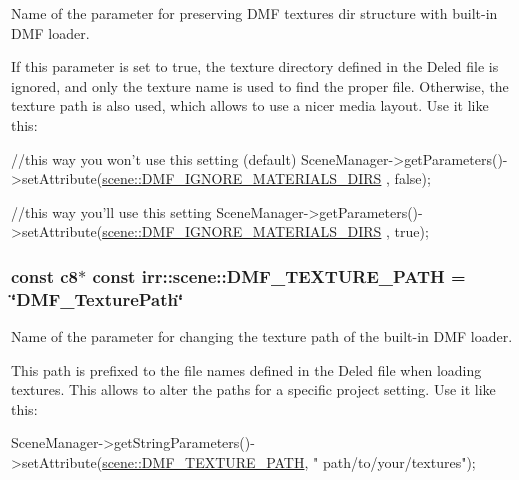 Name of the parameter for preserving D\+MF textures dir structure with built-\/in D\+MF loader. 

If this parameter is set to true, the texture directory defined in the Deled file is ignored, and only the texture name is used to find the proper file. Otherwise, the texture path is also used, which allows to use a nicer media layout. Use it like this\+: 
\begin{DoxyCode}
\textcolor{comment}{//this way you won't use this setting (default)}
SceneManager->getParameters()->setAttribute(\hyperlink{namespaceirr_1_1scene_ae996d826263cf504dd0260d0a096b0d0}{scene::DMF\_IGNORE\_MATERIALS\_DIRS}
      , \textcolor{keyword}{false});
\end{DoxyCode}
 
\begin{DoxyCode}
\textcolor{comment}{//this way you'll use this setting}
SceneManager->getParameters()->setAttribute(\hyperlink{namespaceirr_1_1scene_ae996d826263cf504dd0260d0a096b0d0}{scene::DMF\_IGNORE\_MATERIALS\_DIRS}
      , \textcolor{keyword}{true});
\end{DoxyCode}
\subsubsection[{\texorpdfstring{D\+M\+F\+\_\+\+T\+E\+X\+T\+U\+R\+E\+\_\+\+P\+A\+TH}{DMF\_TEXTURE\_PATH}}]{\setlength{\rightskip}{0pt plus 5cm}const {\bf c8}$\ast$ const irr\+::scene\+::\+D\+M\+F\+\_\+\+T\+E\+X\+T\+U\+R\+E\+\_\+\+P\+A\+TH = \char`\"{}D\+M\+F\+\_\+\+Texture\+Path\char`\"{}}\hypertarget{namespaceirr_1_1scene_a2a6e8bd33eaec1815e3e16a59c269fb5}{}\label{namespaceirr_1_1scene_a2a6e8bd33eaec1815e3e16a59c269fb5}


Name of the parameter for changing the texture path of the built-\/in D\+MF loader. 

This path is prefixed to the file names defined in the Deled file when loading textures. This allows to alter the paths for a specific project setting. Use it like this\+: 
\begin{DoxyCode}
SceneManager->getStringParameters()->setAttribute(\hyperlink{namespaceirr_1_1scene_a2a6e8bd33eaec1815e3e16a59c269fb5}{scene::DMF\_TEXTURE\_PATH}, \textcolor{stringliteral}{"
      path/to/your/textures"});
\end{DoxyCode}
